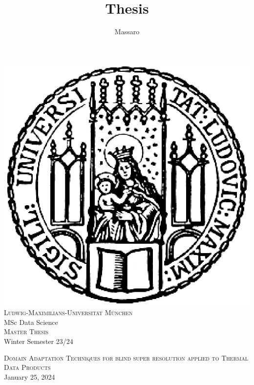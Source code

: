 \documentclass[11pt]{article}
\title{Thesis}
\author{Massaro}
\numberwithin{figure}{section}
\numberwithin{table}{section}
\begin{document}
\pagestyle{fancy}
\renewcommand{\sectionmark}[1]{\markboth{}{\thesection\ \ #1}}
\lhead{}
\chead{}
\rhead{\rightmark}
\lfoot{}
\cfoot{}
\rfoot{\thepage}

%
%
\begin{titlepage}

\thispagestyle{empty}

\begin{center}
\includegraphics[scale=0.5]{Includes/0-siegel.eps}\\
\large{\textsc{Ludwig-Maximilians-Universität München}}\\
\large{MSc Data Science }\\
{\textsc{Master Thesis}} \\ 
\vspace{0.5cm}
\small{Winter Semester 23/24 }
\end{center}

\vspace{2cm}


\begin{center}
\Large{\textsc{Domain Adaptation Techniques for blind super resolution applied to Thermal Data Products}} \\
January 25, 2024
\end{center}

\vspace{2cm}


\end{titlepage}
\end{document}
